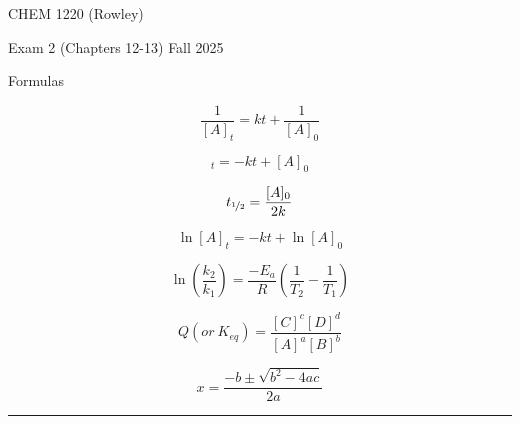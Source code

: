 \documentclass[12pt, letterpaper]{memoir}
\begin{document}
	\pagestyle{empty}

	\begin{center}
		\vspace{12em}
		{\Huge CHEM 1220 (Rowley)}
    
		{\LARGE Exam 2 (Chapters 12-13) Fall 2025}
	\end{center}

  
  \begin{center}
	{\large Formulas}

  \hrulefill
  \end{center}
	
  \begin{minipage}[c][\stretch{1}][c]{0.46\linewidth}
    \begin{equation*}
      \dfrac{1}{[A]_t} = kt + \dfrac{1}{[A]_0}
    \end{equation*}

    \begin{equation*}
      [A]_t=-kt+[A]_0
    \end{equation*}

    \begin{equation*}
      t_{\nicefrac{1}{2}} = \dfrac{[A]_0}{2k}
    \end{equation*}

    \begin{equation*}
      \ln[A]_t=-kt+\ln[A]_0
    \end{equation*}

    \begin{equation*}
      \ln\left(\dfrac{k_2}{k_1}\right)=\dfrac{-E_a}{R}\left(\dfrac{1}{T_2}-\dfrac{1}{T_1}\right)
    \end{equation*}

    \begin{equation*}
      Q \left(or~K_{eq}\right) = \dfrac{[C]^c[D]^d}{[A]^a[B]^b}
    \end{equation*}

    \begin{equation*}
      x=\dfrac{-b\pm\sqrt{b^2-4ac}}{2a}
    \end{equation*}
  \end{minipage}
  \rule[-210pt]{1.5pt}{420pt}
\end{document}
